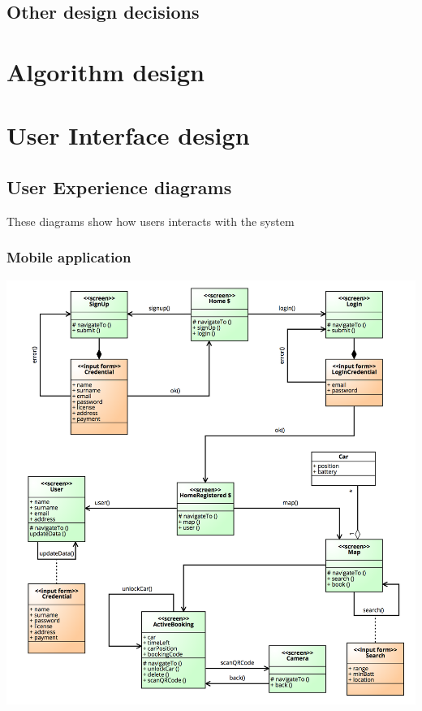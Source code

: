 \documentclass[]{article}
\begin{document}
\subsection{Other design decisions}\label{other-design-decisions}

\section{Algorithm design}\label{algorithm-design}

\section{User Interface design}\label{user-interface-design}

\subsection{User Experience diagrams}\label{user-experience-diagrams}

These diagrams show how users interacts with the system

\subsubsection{Mobile application}\label{mobile-application-1}

\centerline{\includegraphics{./images/UX_Mobile.png}}
\end{document}
